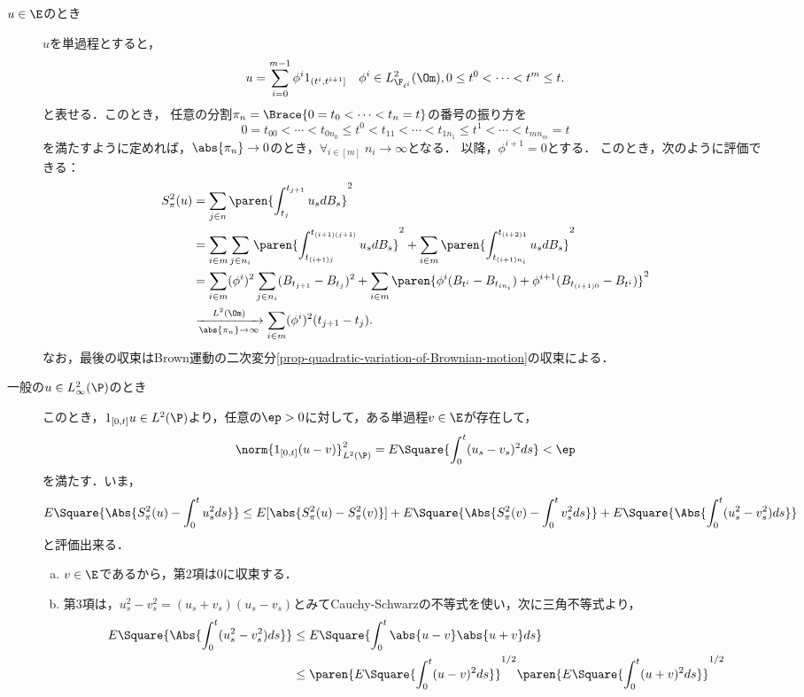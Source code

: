 \documentclass[uplatex,dvipdfmx]{jsreport}
\begin{document}
\begin{Proof}\mbox{}
    \begin{description}
        \item[$u\in\E$のとき] 
        $u$を単過程とすると，
        \[u=\sum^{m-1}_{i=0}\phi^i1_{(t^i,t^{i+1}]}\quad\phi^i\in L^2_{\F_{t^i}}(\Om),0\le t^0<\cdots<t^m\le t.\]
        と表せる．このとき，
        任意の分割$\pi_n=\Brace{0=t_0<\cdots<t_n=t}$の番号の振り方を
        \[0=t_{00}<\cdots<t_{0n_0}\le t^0<t_{11}<\cdots<t_{1n_1}\le t^1<\cdots<t_{mn_m}=t\]
        を満たすように定めれば，$\abs{\pi_n}\to0$のとき，$\forall_{i\in[m]}\;n_i\to\infty$となる．
        以降，$\phi^{i+1}=0$とする．
        このとき，次のように評価できる：
        \begin{align*}
            S_\pi^2(u)&=\sum_{j\in n}\paren{\int^{t_{j+1}}_{t_j}u_sdB_s}^2\\
            &=\sum_{i\in m}\sum_{j\in n_i}\paren{\int^{t_{(i+1)(j+1)}}_{t_{(i+1)j}}u_sdB_s}^2+\sum_{i\in m}\paren{\int^{t_{(i+2)1}}_{t_{(i+1)n_i}}u_sdB_s}^2\\
            &=\sum_{i\in m}(\phi^i)^2\sum_{j\in n_i}(B_{t_{j+1}}-B_{t_j})^2+\sum_{i\in m}\paren{\phi^i(B_{t^i}-B_{t_{in_i}})+\phi^{i+1}(B_{t_{(i+1)0}}-B_{t^i})}^2\\
            &\xrightarrow[\abs{\pi_n}\to\infty]{L^2(\Om)}\sum_{i\in m}(\phi^i)^2(t_{j+1}-t_j).
        \end{align*}
        なお，最後の収束はBrown運動の二次変分\ref{prop-quadratic-variation-of-Brownian-motion}の収束による．
        \item[一般の$u\in L^2_\infty(\P)$のとき] 
        このとき，$1_{[0,t]}u\in L^2(\P)$より，任意の$\ep>0$に対して，ある単過程$v\in\E$が存在して，
        \[\norm{1_{[0,t]}(u-v)}^2_{L^2(\P)}=E\Square{\int^t_0(u_s-v_s)^2ds}<\ep\]
        を満たす．いま，
        \[E\Square{\Abs{S^2_\pi(u)-\int^t_0u^2_sds}}\le E[\abs{S^2_\pi(u)-S^2_\pi(v)}]+E\Square{\Abs{S^2_\pi(v)-\int^t_0v^2_sds}}+E\Square{\Abs{\int^t_0(u_s^2-v_s^2)ds}}\]
        と評価出来る．
        \begin{enumerate}[(a)]
            \item $v\in\E$であるから，第2項は$0$に収束する．
            \item 第3項は，$u_s^2-v_s^2=(u_s+v_s)(u_s-v_s)$とみてCauchy-Schwarzの不等式を使い，次に三角不等式より，
            \begin{align*}
                E\Square{\Abs{\int^t_0(u_s^2-v_s^2)ds}}&\le E\Square{\int^t_0\abs{u-v}\abs{u+v}ds}\\
                &\le\paren{E\Square{\int^t_0(u-v)^2ds}}^{1/2}\paren{E\Square{\int^t_0(u+v)^2ds}}^{1/2}

\end{align*}
\end{enumerate}
\end{description}
\end{Proof}
\end{document}
